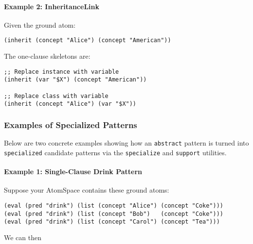 \paragraph{Example 2: InheritanceLink}

Given the ground atom:

\begin{verbatim}
(inherit (concept "Alice") (concept "American"))
\end{verbatim}

The one-clause skeletons are:

\begin{verbatim}
;; Replace instance with variable
(inherit (var "$X") (concept "American"))

;; Replace class with variable
(inherit (concept "Alice") (var "$X"))
\end{verbatim}


\subsubsection{Examples of Specialized Patterns}

Below are two concrete examples showing how an \texttt{abstract} pattern is turned into \texttt{specialized} candidate patterns via the \texttt{specialize} and \texttt{support} utilities.

\paragraph{Example 1: Single-Clause Drink Pattern}

Suppose your AtomSpace contains these ground atoms:
\begin{verbatim}
(eval (pred "drink") (list (concept "Alice") (concept "Coke")))
(eval (pred "drink") (list (concept "Bob")   (concept "Coke")))
(eval (pred "drink") (list (concept "Carol") (concept "Tea")))
\end{verbatim}

We can then

